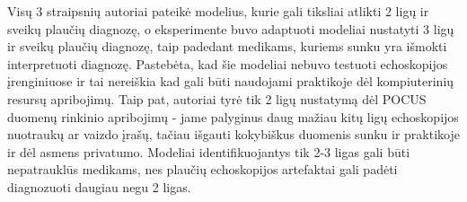 \documentclass[fleqn]{VUMIFKompMagistrinis}
\begin{document}
\par
Visų 3 straipsnių autoriai pateikė modelius, kurie gali tiksliai atlikti 2 ligų ir sveikų plaučių diagnozę, o eksperimente buvo adaptuoti modeliai nustatyti 3 ligų ir sveikų plaučių diagnozę, taip padedant medikams, kuriems sunku yra išmokti interpretuoti diagnozę. Pastebėta, kad šie modeliai nebuvo testuoti echoskopijos įrenginiuose ir tai nereiškia kad gali būti naudojami praktikoje dėl kompiuterinių resursų apribojimų. Taip pat, autoriai tyrė tik 2 ligų nustatymą dėl POCUS duomenų rinkinio apribojimų - jame palyginus daug mažiau kitų ligų echoskopijos nuotraukų ar vaizdo įrašų, tačiau išgauti kokybiškus duomenis sunku ir praktikoje ir dėl asmens privatumo. Modeliai identifikuojantys tik 2-3 ligas gali būti nepatrauklūs medikams, nes plaučių echoskopijos artefaktai gali padėti diagnozuoti daugiau negu 2 ligas.  


\printbibliography[heading=bibintoc]  %
\end{document}
